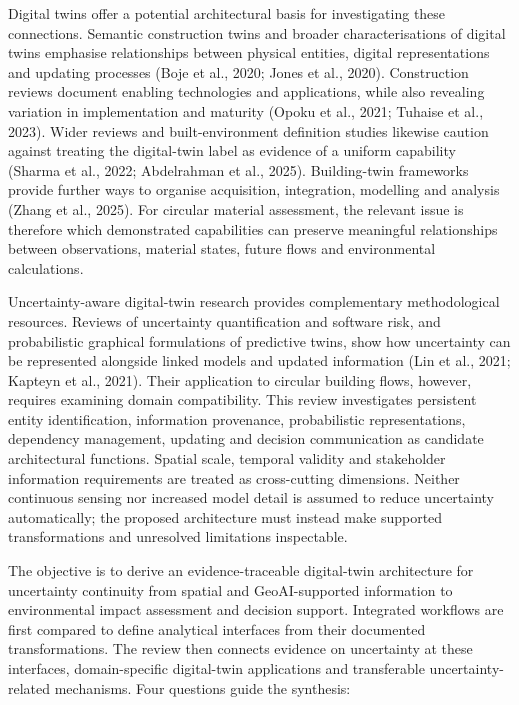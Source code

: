 Digital twins offer a potential architectural basis for investigating these connections. Semantic construction twins and broader characterisations of digital twins emphasise relationships between physical entities, digital representations and updating processes (Boje et al., 2020; Jones et al., 2020). Construction reviews document enabling technologies and applications, while also revealing variation in implementation and maturity (Opoku et al., 2021; Tuhaise et al., 2023). Wider reviews and built-environment definition studies likewise caution against treating the digital-twin label as evidence of a uniform capability (Sharma et al., 2022; Abdelrahman et al., 2025). Building-twin frameworks provide further ways to organise acquisition, integration, modelling and analysis (Zhang et al., 2025). For circular material assessment, the relevant issue is therefore which demonstrated capabilities can preserve meaningful relationships between observations, material states, future flows and environmental calculations.

Uncertainty-aware digital-twin research provides complementary methodological resources. Reviews of uncertainty quantification and software risk, and probabilistic graphical formulations of predictive twins, show how uncertainty can be represented alongside linked models and updated information (Lin et al., 2021; Kapteyn et al., 2021). Their application to circular building flows, however, requires examining domain compatibility. This review investigates persistent entity identification, information provenance, probabilistic representations, dependency management, updating and decision communication as candidate architectural functions. Spatial scale, temporal validity and stakeholder information requirements are treated as cross-cutting dimensions. Neither continuous sensing nor increased model detail is assumed to reduce uncertainty automatically; the proposed architecture must instead make supported transformations and unresolved limitations inspectable.

The objective is to derive an evidence-traceable digital-twin architecture for uncertainty continuity from spatial and GeoAI-supported information to environmental impact assessment and decision support. Integrated workflows are first compared to define analytical interfaces from their documented transformations. The review then connects evidence on uncertainty at these interfaces, domain-specific digital-twin applications and transferable uncertainty-related mechanisms. Four questions guide the synthesis:

